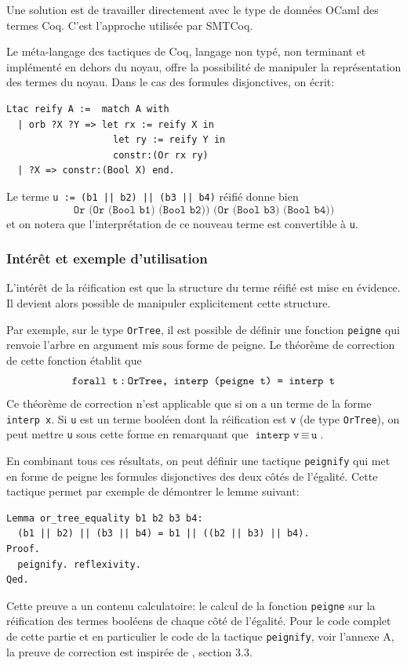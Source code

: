 \documentclass[11pt]{article}
\begin{document}
Une solution est de travailler directement avec le type de données OCaml des termes Coq. C'est l'approche utilisée par SMTCoq. \medbreak

Le méta-langage des tactiques de Coq, langage non typé, non terminant et implémenté en dehors du noyau, offre la possibilité de manipuler la représentation des termes du noyau. Dans le cas des formules disjonctives, on écrit:
\begin{lstlisting}[frame=single]
Ltac reify A :=  match A with
  | orb ?X ?Y => let rx := reify X in
                   let ry := reify Y in
                   constr:(Or rx ry)
  | ?X => constr:(Bool X) end.

\end{lstlisting}
Le terme \texttt{u := (b1 || b2) || (b3 || b4)} réifié donne bien 
\[\texttt{Or (Or (Bool b1) (Bool b2)) (Or (Bool b3) (Bool b4))}\] 
et on notera que l'interprétation de ce nouveau terme est convertible à \texttt{u}.




\subsubsection{Intérêt et exemple d'utilisation} \label{interet_reification}

L'intérêt de la réification est que la structure du terme réifié est mise en évidence. Il devient alors possible de manipuler explicitement cette structure. \medbreak

Par exemple, sur le type \texttt{OrTree}, il est possible de définir une fonction \texttt{peigne} qui renvoie l'arbre en argument mis sous forme de peigne. Le théorème de correction de cette fonction établit que
\[ \texttt{forall t\,:\,OrTree, interp (peigne t) = interp t} \]
Ce théorème de correction n'est applicable que si on a un terme de la forme \texttt{interp x}. Si \texttt{u} est un terme booléen dont la réification est \texttt{v} (de type \texttt{OrTree}), on peut mettre \texttt{u} sous cette forme en remarquant que $\texttt{interp v}\,\equiv\,\texttt{u}$. \medbreak

En combinant tous ces résultats, on peut définir une tactique \texttt{peignify} qui met en forme de peigne les formules disjonctives des deux côtés de l'égalité. Cette tactique permet par exemple de démontrer le lemme suivant: 
\begin{lstlisting}[frame=single]
Lemma or_tree_equality b1 b2 b3 b4:
  (b1 || b2) || (b3 || b4) = b1 || ((b2 || b3) || b4).
Proof.
  peignify. reflexivity.
Qed.
\end{lstlisting}
Cette preuve a un contenu calculatoire: le calcul de la fonction \texttt{peigne} sur la réification des termes booléens de chaque côté de l'égalité. Pour le code complet de cette partie et en particulier le code de la tactique \texttt{peignify}, voir l'annexe A, la preuve de correction est inspirée de \cite{coq_intro}, section 3.3.
\end{document}
